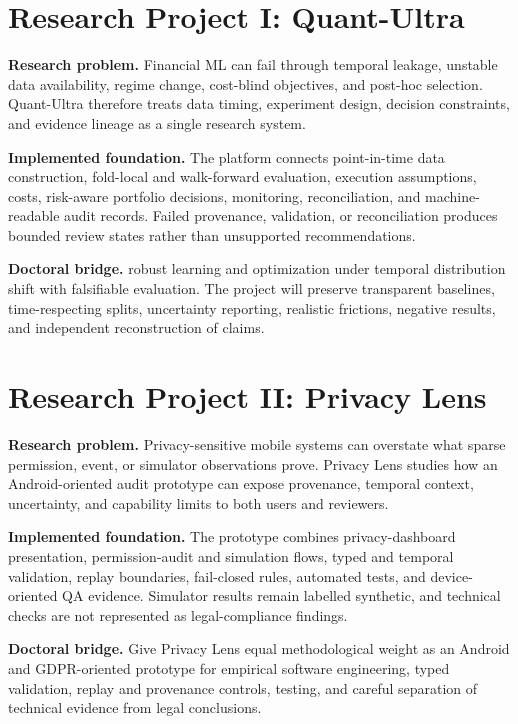 \documentclass[11pt]{article}
\begin{document}
\section*{Research Project I: Quant-Ultra}
\textbf{Research problem.} Financial ML can fail through temporal leakage, unstable data availability, regime change, cost-blind objectives, and post-hoc selection. Quant-Ultra therefore treats data timing, experiment design, decision constraints, and evidence lineage as a single research system.

\textbf{Implemented foundation.} The platform connects point-in-time data construction, fold-local and walk-forward evaluation, execution assumptions, costs, risk-aware portfolio decisions, monitoring, reconciliation, and machine-readable audit records. Failed provenance, validation, or reconciliation produces bounded review states rather than unsupported recommendations.

\textbf{Doctoral bridge.} robust learning and optimization under temporal distribution shift with falsifiable evaluation. The project will preserve transparent baselines, time-respecting splits, uncertainty reporting, realistic frictions, negative results, and independent reconstruction of claims.

\section*{Research Project II: Privacy Lens}
\textbf{Research problem.} Privacy-sensitive mobile systems can overstate what sparse permission, event, or simulator observations prove. Privacy Lens studies how an Android-oriented audit prototype can expose provenance, temporal context, uncertainty, and capability limits to both users and reviewers.

\textbf{Implemented foundation.} The prototype combines privacy-dashboard presentation, permission-audit and simulation flows, typed and temporal validation, replay boundaries, fail-closed rules, automated tests, and device-oriented QA evidence. Simulator results remain labelled synthetic, and technical checks are not represented as legal-compliance findings.

\textbf{Doctoral bridge.} Give Privacy Lens equal methodological weight as an Android and GDPR-oriented prototype for empirical software engineering, typed validation, replay and provenance controls, testing, and careful separation of technical evidence from legal conclusions.
\end{document}
